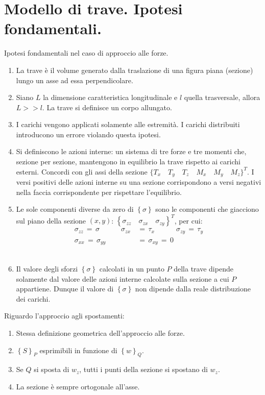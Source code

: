 \section{Modello di trave. Ipotesi fondamentali.}
Ipotesi fondamentali nel caso di approccio alle forze.
\begin{enumerate}
    \item La trave è il volume generato dalla traslazione di una figura piana (sezione) lungo un asse ad essa perpendicolare.\\
    \item Siano $L$ la dimensione caratteristica longitudinale e $l$ quella trasversale, allora $L>>l$. La trave si definisce un corpo allungato.\\
    \item I carichi vengono applicati solamente alle estremità. I carichi distribuiti introducono un errore violando questa ipotesi.\\
    \item Si definiscono le azioni interne: un sistema di tre forze e tre momenti che, sezione per sezione, mantengono in equilibrio la trave rispetto ai carichi esterni. Concordi con gli assi della sezione $\{ T_x \quad T_y \quad T_z \quad M_x \quad M_y \quad M_z \}^T$. I versi positivi delle azioni interne su una sezione corrispondono a versi negativi nella faccia corrispondente per rispettare l'equilibrio.\\
    \item Le sole componenti diverse da zero di $\left\{\sigma\right\}$ sono le componenti che giacciono sul piano della sezione $(x,y)$: $\left\{ \sigma_{zz} \quad \sigma_{zx} \quad \sigma_{zy} \right\}^T$, per cui:
    \begin{align*}
        \sigma_{zz} \,=\, \sigma \quad\quad\quad \sigma_{zx}\,&=\,\tau_x \quad\quad\quad \sigma_{zy} \,=\,\tau_y\\
         \sigma_{xx}\,=\,\sigma_{yy}\,&=\,\sigma_{xy}\,=\,0
    \end{align*}\\
    \item Il valore degli sforzi $\left\{\sigma\right\}$ calcolati in un punto $P$ della trave dipende solamente dal valore delle azioni interne calcolate sulla sezione a cui $P$ appartiene. Dunque il valore di $\left\{\sigma\right\}$ non dipende dalla reale distribuzione dei carichi.
\end{enumerate}

Riguardo l'approccio agli spostamenti:
\begin{enumerate}
    \item Stessa definizione geometrica dell'approccio alle forze.\\
    \item $\left\{S\right\}_P$ esprimibili in funzione di $\left\{w\right\}_Q$.\\
    \item Se $Q$ si sposta di $w_z$, tutti i punti della sezione si spostano di $w_z$.\\
    \item La sezione è sempre ortogonale all'asse.
\end{enumerate}